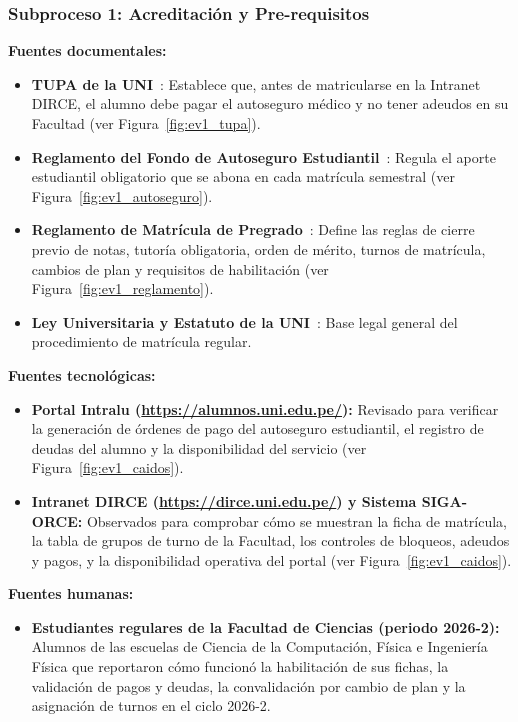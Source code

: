 \subsubsection{Subproceso 1: Acreditación y Pre-requisitos}

\textbf{Fuentes documentales:}
\begin{itemize}
    \item \textbf{TUPA de la UNI}~\cite[págs.~15--16]{tupa2024}: Establece que, antes de matricularse en la Intranet DIRCE, el alumno debe pagar el autoseguro médico y no tener adeudos en su Facultad (ver Figura~\ref{fig:ev1_tupa}).
    \item \textbf{Reglamento del Fondo de Autoseguro Estudiantil}~\cite[nums.~6.1.1 y 6.2]{autoseguro2023}: Regula el aporte estudiantil obligatorio que se abona en cada matrícula semestral (ver Figura~\ref{fig:ev1_autoseguro}).
    \item \textbf{Reglamento de Matrícula de Pregrado}~\cite[Caps.~I--V]{reglamento2022}: Define las reglas de cierre previo de notas, tutoría obligatoria, orden de mérito, turnos de matrícula, cambios de plan y requisitos de habilitación (ver Figura~\ref{fig:ev1_reglamento}).
    \item \textbf{Ley Universitaria y Estatuto de la UNI}~\cite{ley30220}: Base legal general del procedimiento de matrícula regular.
\end{itemize}

\textbf{Fuentes tecnológicas:}
\begin{itemize}
    \item \textbf{Portal Intralu (\url{https://alumnos.uni.edu.pe/}):} Revisado para verificar la generación de órdenes de pago del autoseguro estudiantil, el registro de deudas del alumno y la disponibilidad del servicio (ver Figura~\ref{fig:ev1_caidos}). %
    \item \textbf{Intranet DIRCE (\url{https://dirce.uni.edu.pe/}) y Sistema SIGA-ORCE:} Observados para comprobar cómo se muestran la ficha de matrícula, la tabla de grupos de turno de la Facultad, los controles de bloqueos, adeudos y pagos, y la disponibilidad operativa del portal (ver Figura~\ref{fig:ev1_caidos}). %
\end{itemize}

\textbf{Fuentes humanas:}
\begin{itemize}
    \item \textbf{Estudiantes regulares de la Facultad de Ciencias (periodo 2026-2):} Alumnos de las escuelas de Ciencia de la Computación, Física e Ingeniería Física que reportaron cómo funcionó la habilitación de sus fichas, la validación de pagos y deudas, la convalidación por cambio de plan y la asignación de turnos en el ciclo 2026-2.
\end{itemize}
